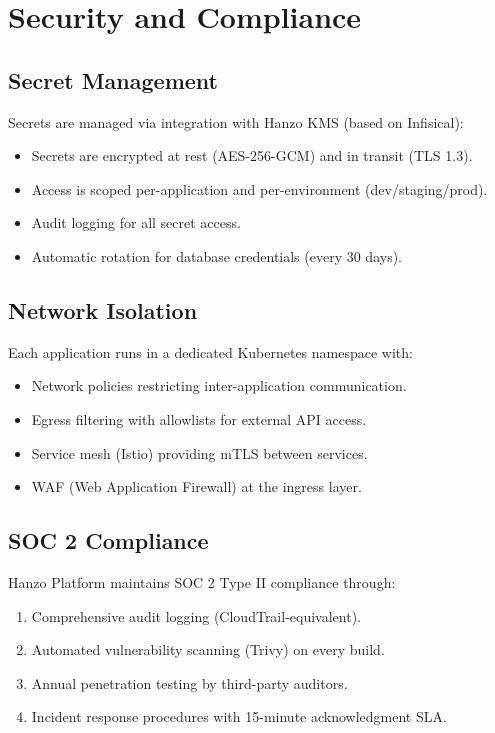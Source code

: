 \section{Security and Compliance}

\label{sec:security}

\subsection{Secret Management}

Secrets are managed via integration with Hanzo KMS (based on Infisical):

\begin{itemize}[leftmargin=1.1em]
    \item Secrets are encrypted at rest (AES-256-GCM) and in transit (TLS 1.3).
    \item Access is scoped per-application and per-environment (dev/staging/prod).
    \item Audit logging for all secret access.
    \item Automatic rotation for database credentials (every 30 days).
\end{itemize}

\subsection{Network Isolation}

Each application runs in a dedicated Kubernetes namespace with:
\begin{itemize}[leftmargin=1.1em]
    \item Network policies restricting inter-application communication.
    \item Egress filtering with allowlists for external API access.
    \item Service mesh (Istio) providing mTLS between services.
    \item WAF (Web Application Firewall) at the ingress layer.
\end{itemize}

\subsection{SOC 2 Compliance}

Hanzo Platform maintains SOC 2 Type II compliance through:
\begin{enumerate}[leftmargin=1.4em]
    \item Comprehensive audit logging (CloudTrail-equivalent).
    \item Automated vulnerability scanning (Trivy) on every build.
    \item Annual penetration testing by third-party auditors.
    \item Incident response procedures with 15-minute acknowledgment SLA.
\end{enumerate}

